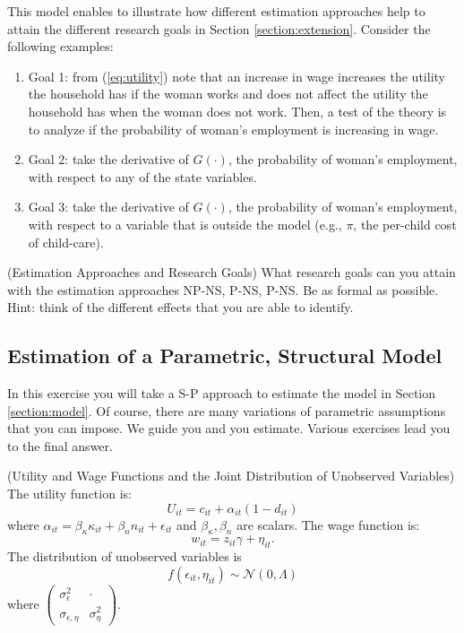 \indent This model enables to illustrate how different estimation approaches help to attain the different research goals in Section \ref{section:extension}. Consider the following examples:
\begin{enumerate}
\item Goal 1: from (\ref{eq:utility}) note that an increase in wage increases the utility the household has if the woman works and does not affect the utility the household has when the woman does not work. Then, a test of the theory is to analyze if the probability of woman's employment is increasing in wage. 
\item Goal 2: take the derivative of $G(\cdot)$, the probability of woman's employment, with respect to any of the state variables.
\item Goal 3: take the derivative of $G(\cdot)$, the probability of woman's employment, with respect to a variable that is outside the model (e.g., $\pi$, the per-child cost of child-care). 
\end{enumerate}

\begin{exercise} (Estimation Approaches and Research Goals)
What research goals can you attain with the estimation approaches NP-NS, P-NS, P-NS. Be as formal as possible. Hint: think of the different effects that you are able to identify.  
\end{exercise}

\subsection{Estimation of a Parametric, Structural Model}
In this exercise you will take a S-P approach to estimate the model in Section \ref{section:model}. Of course, there are many variations of parametric assumptions that you can impose. We guide you and you estimate. Various exercises lead you to the final answer. 

\begin{assumption} (Utility and Wage Functions and the Joint Distribution of Unobserved Variables) \label{assumption:utwajo}
The utility function is:
\begin{equation}
U_{it} = c_{it} + \alpha_{it} (1 - d_{it})
\end{equation}
\noindent where $\alpha_{it} = \beta_{\kappa} \kappa_{it} + \beta_{n} n_{it} + \epsilon_{it}$ and $\beta_{\kappa},\beta_{n}$ are scalars. The wage function is:
\begin{equation}
w_{it} = z_{it} \gamma + \eta_{it}.
\end{equation}
\noindent The distribution of unobserved variables is
\begin{equation}
f \left( \epsilon_{it}, \eta_{it} \right) \sim \mathcal{N} \left( 0, \Lambda \right)
\end{equation}
where $\left( \begin{array}{cc} 
\sigma_{\epsilon}^2 & \cdot \\
\sigma_{\epsilon, \eta} & \sigma_{\eta}^2
\end{array} \right)$.  
\end{assumption}

